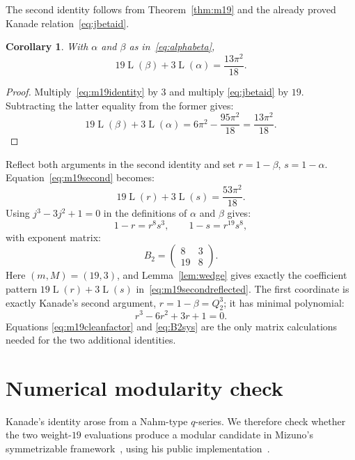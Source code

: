\documentclass[preprint,12pt,number]{elsarticle}
\newtheorem{corollary}[theorem]{Corollary}
\theoremstyle{remark}
\newcommand{\Lr}{\operatorname{L}}
\begin{document}
The second identity follows from Theorem~\ref{thm:m19} and
the already proved Kanade relation~\eqref{eq:jbetaid}.

\begin{corollary}\label{cor:m19second}
With $\alpha$ and $\beta$ as in~\eqref{eq:alphabeta},
\begin{equation}\label{eq:m19second}
19\Lr(\beta)+3\Lr(\alpha)=\frac{13\pi^2}{18}.
\end{equation}
\end{corollary}

\begin{proof}
Multiply~\eqref{eq:m19identity} by $3$ and multiply
\eqref{eq:jbetaid} by $19$.  Subtracting the latter equality from the
former gives:
\[
19\Lr(\beta)+3\Lr(\alpha)
=6\pi^2-\frac{95\pi^2}{18}
=\frac{13\pi^2}{18}.
\]
\end{proof}

\noindent Reflect both arguments in the second identity and set
$r=1-\beta$, $s=1-\alpha$.  Equation~\eqref{eq:m19second} becomes:
\begin{equation}\label{eq:m19secondreflected}
19\Lr(r)+3\Lr(s)=\frac{53\pi^2}{18}.
\end{equation}
Using $j^3-3j^2+1=0$ in the definitions of $\alpha$ and $\beta$ gives:
\begin{equation}\label{eq:B2sys}
1-r=r^8s^3,\qquad
1-s=r^{19}s^8,
\end{equation}
with exponent matrix:
\begin{equation}\label{eq:B2}
B_2=\begin{pmatrix}8&3\\19&8\end{pmatrix}.
\end{equation}
Here $(m,M)=(19,3)$, and Lemma~\ref{lem:wedge} gives exactly the coefficient
pattern $19\Lr(r)+3\Lr(s)$ in~\eqref{eq:m19secondreflected}.  The first
coordinate is exactly Kanade's second argument, $r=1-\beta=Q_2^3$; it has
minimal polynomial:
\[
r^3-6r^2+3r+1=0.
\]
Equations \eqref{eq:m19cleanfactor} and \eqref{eq:B2sys} are the only
matrix calculations needed for the two additional identities.

\section{Numerical modularity check}\label{sec:qseries}

\noindent Kanade's identity arose from a Nahm-type $q$-series.  We
therefore check whether the two weight-$19$ evaluations produce a modular
candidate in Mizuno's symmetrizable framework~\cite{Mizuno}, using his
public implementation~\cite{MizunoCode}.
\end{document}
